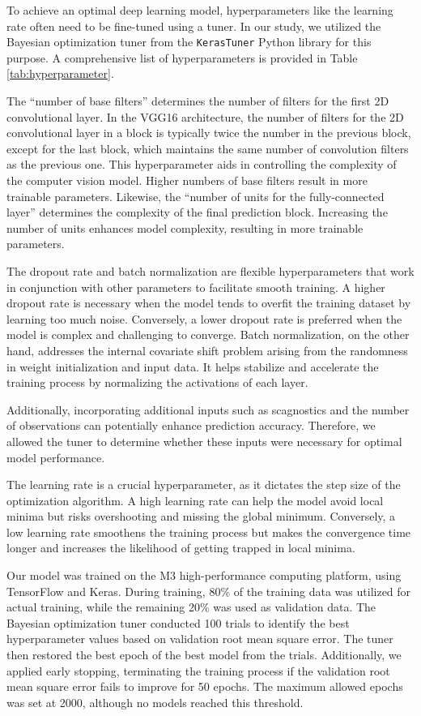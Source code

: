\documentclass[]{interact}
\theoremstyle{plain}%
\theoremstyle{definition}
\theoremstyle{remark}
\begin{document}
To achieve an optimal deep learning model, hyperparameters like the
learning rate often need to be fine-tuned using a tuner. In our study,
we utilized the Bayesian optimization tuner from the \texttt{KerasTuner}
Python library \citep{omalley2019kerastuner} for this purpose. A
comprehensive list of hyperparameters is provided in Table
\ref{tab:hyperparameter}.

The ``number of base filters'' determines the number of filters for the
first 2D convolutional layer. In the VGG16 architecture, the number of
filters for the 2D convolutional layer in a block is typically twice the
number in the previous block, except for the last block, which maintains
the same number of convolution filters as the previous one. This
hyperparameter aids in controlling the complexity of the computer vision
model. Higher numbers of base filters result in more trainable
parameters. Likewise, the ``number of units for the fully-connected
layer'' determines the complexity of the final prediction block.
Increasing the number of units enhances model complexity, resulting in
more trainable parameters.

The dropout rate and batch normalization are flexible hyperparameters
that work in conjunction with other parameters to facilitate smooth
training. A higher dropout rate is necessary when the model tends to
overfit the training dataset by learning too much noise. Conversely, a
lower dropout rate is preferred when the model is complex and
challenging to converge. Batch normalization, on the other hand,
addresses the internal covariate shift problem arising from the
randomness in weight initialization and input data. It helps stabilize
and accelerate the training process by normalizing the activations of
each layer.

Additionally, incorporating additional inputs such as scagnostics and
the number of observations can potentially enhance prediction accuracy.
Therefore, we allowed the tuner to determine whether these inputs were
necessary for optimal model performance.

The learning rate is a crucial hyperparameter, as it dictates the step
size of the optimization algorithm. A high learning rate can help the
model avoid local minima but risks overshooting and missing the global
minimum. Conversely, a low learning rate smoothens the training process
but makes the convergence time longer and increases the likelihood of
getting trapped in local minima.

Our model was trained on the M3 high-performance computing platform,
using TensorFlow and Keras. During training, 80\% of the training data
was utilized for actual training, while the remaining 20\% was used as
validation data. The Bayesian optimization tuner conducted 100 trials to
identify the best hyperparameter values based on validation root mean
square error. The tuner then restored the best epoch of the best model
from the trials. Additionally, we applied early stopping, terminating
the training process if the validation root mean square error fails to
improve for 50 epochs. The maximum allowed epochs was set at 2000,
although no models reached this threshold.
\end{document}
